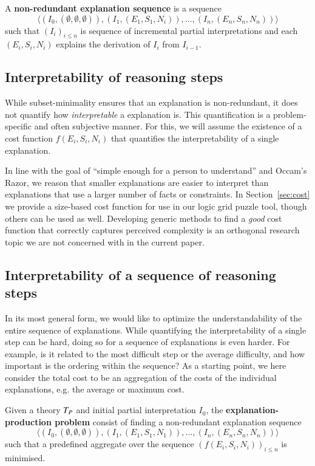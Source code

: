 \begin{definition} \label{def:nonred}
A \textbf{non-redundant explanation sequence} is a sequence 
\[\langle(I_0,(\emptyset,\emptyset,\emptyset)), (I_1,(E_1,S_1,N_i)), \dots ,(I_n,(E_n,S_n,N_n))\rangle\]
such that $(I_i)_{i\leq n}$ is sequence of incremental partial interpretations and each $(E_i,S_i,N_i)$ explains the derivation of $I_i$ from $I_{i-1}$.
\end{definition} 

\subsection{Interpretability of reasoning steps}
While subset-minimality ensures that an explanation is non-redundant, it does not quantify how \textit{interpretable} a explanation is. 
This quantification is a problem-specific and often subjective manner. 
For this, we will assume the existence of a cost function $f(E_i,S_i,N_i)$ that quantifies the interpretability of a single explanation. 

In line with the goal of ``simple enough for a person to understand'' and Occam's Razor, we reason that smaller explanations are easier to interpret than explanations that use a larger number of facts or constraints.
In Section~\ref{sec:cost} we provide a size-based cost function for use in our logic grid puzzle tool, though others can be used as well.
Developing generic methods to find a \emph{good} cost function that correctly captures perceived complexity is an orthogonal research topic we are not concerned with in the current paper. 

\subsection{Interpretability of a sequence of reasoning steps}
In its most general form, we would like to optimize the understandability of the entire sequence of explanations. 
While quantifying the interpretability of a single step can be hard, doing so for a sequence of explanations is even harder. For example, is it related to the most difficult step or the average difficulty, and how important is the ordering within the sequence?
As a starting point, we here consider the total cost to be an aggregation of the costs of the individual explanations, e.g. the average or maximum cost.

\begin{definition}
Given a theory $T_P$ and initial partial interpretation $I_0$, the \textbf{explanation-production problem} consist of finding a non-redundant explanation sequence
\[\langle(I_0,(\emptyset,\emptyset,\emptyset)), (I_1,(E_1,S_1,N_1)), \dots ,(I_n,(E_n,S_n,N_n))\rangle\]
such that a predefined aggregate over the sequence $\left(f(E_i,S_i,N_i)\right)_{i\leq n}$ is minimised.
\end{definition} 

